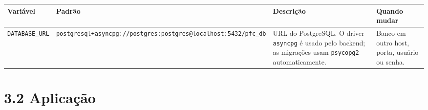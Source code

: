 \documentclass[
  brazilian,
  a4paper,12pt,oneside]{report}
\newcounter{none} %
\begin{document}
{\def\LTcaptype{none} %
\begin{longtable}[]{@{}
  >{\raggedright\arraybackslash}p{}
  >{\raggedright\arraybackslash}p{}
  >{\raggedright\arraybackslash}p{}
  >{\raggedright\arraybackslash}p{}@{}}
\toprule\noalign{}
\begin{minipage}[b]{\linewidth}\raggedright
Variável
\end{minipage} & \begin{minipage}[b]{\linewidth}\raggedright
Padrão
\end{minipage} & \begin{minipage}[b]{\linewidth}\raggedright
Descrição
\end{minipage} & \begin{minipage}[b]{\linewidth}\raggedright
Quando mudar
\end{minipage} \\
\midrule\noalign{}
\endhead
\bottomrule\noalign{}
\endlastfoot
\texttt{DATABASE\_}\allowbreak{}\texttt{URL} &
\texttt{postgresql+asyncpg:}\allowbreak{}\texttt{/}\allowbreak{}\texttt{/}\allowbreak{}\texttt{postgres:}\allowbreak{}\texttt{postgres@localhost:}\allowbreak{}\texttt{5432/}\allowbreak{}\texttt{pfc\_}\allowbreak{}\texttt{db}
& URL do PostgreSQL. O driver \texttt{asyncpg} é usado pelo backend; as
migrações usam \texttt{psycopg2} automaticamente. & Banco em outro host,
porta, usuário ou senha. \\
\end{longtable}
}

\section{3.2 Aplicação}\label{aplicauxe7uxe3o}
\end{document}
